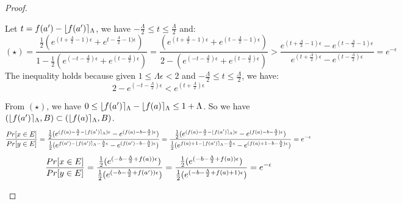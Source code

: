 \documentclass[a4paper,11pt]{article}
\begin{document}
\begin{proof}
\begin{itemize}
	Let $t = f(a') - \lfloor f(a') \rceil_{\Lambda}$, we have $-\frac{\Lambda}{2} \leq t \leq \frac{\Lambda}{2} $ and:
	\[
	(\star) = \frac{{\frac{1}{2}(
				e^{(t + \frac{\Lambda}{2} - 1)\epsilon}
				+ e^{t - \frac{\Lambda}{2} - 1)\epsilon})}
			}
			{1 - \frac{1}{2}(
				e^{(- t - \frac{\Lambda}{2})\epsilon}
				+ e^{(t - \frac{\Lambda}{2})\epsilon})}
	= \frac{ (
				e^{(t + \frac{\Lambda}{2} - 1)\epsilon}
				+ e^{(t -\frac{\Lambda}{2} - 1)\epsilon})
			}
			{2 - (
				e^{(-t - \frac{\Lambda}{2})\epsilon}
				+ e^{(t - \frac{\Lambda}{2})\epsilon})}
	> \frac{
				e^{(t + \frac{\Lambda}{2} - 1)\epsilon}
				-
				e^{(t - \frac{\Lambda}{2} - 1)\epsilon}
			}
			{
				e^{(t + \frac{\Lambda}{2})\epsilon}
				- e^{(t - \frac{\Lambda}{2})\epsilon}
			}	
	= e^{-\epsilon}
	\]
	The inequality holds because given $1 \leq \Lambda \epsilon < 2$
	and $-\frac{\Lambda}{2} \leq t \leq \frac{\Lambda}{2} $, we have:
	\[
	2 - e^{(-t -\frac{\Lambda}{2})\epsilon} < e^{(t + \frac{\Lambda}{2})\epsilon}
	\]	

	From $(\star)$, we have $0 \leq \lfloor f(a') \rceil_{\Lambda} - \lfloor f(a) \rceil_{\Lambda} \leq 1 + \Lambda$.
	So we have $(\lfloor f(a') \rceil_{\Lambda}, B) \subset (\lfloor f(a) \rceil_{\Lambda}, B)$.
	\[
	\frac{Pr[x \in E]}{Pr[y \in E]} 
	= \frac{\frac{1}{2}(
				e^{(f(a) - \frac{\Lambda}{2} - \lfloor f(a') \rceil_{\Lambda})\epsilon}
				- e^{(f(a) -b - \frac{\Lambda}{2})\epsilon})}
				{\frac{1}{2}(
				e^{f(a') - \lfloor f(a') \rceil_{\Lambda} -\frac{\Lambda}{2}\epsilon}
				- e^{(f(a') -b -\frac{\Lambda}{2})\epsilon})} \\
	= \frac{\frac{1}{2}(
				e^{(f(a) - \frac{\Lambda}{2} - \lfloor f(a') \rceil_{\Lambda})\epsilon}
				- e^{(f(a) -b - \frac{\Lambda}{2})\epsilon})}
				{\frac{1}{2}(
				e^{f(a) + 1 - \lfloor f(a') \rceil_{\Lambda} -\frac{\Lambda}{2}\epsilon}
				- e^{(f(a) + 1 -b -\frac{\Lambda}{2})\epsilon})} \\
	= e^{-\epsilon}
	\]
	\[
	\frac{Pr[x \in E]}{Pr[y \in E]} 
	= \frac{\frac{1}{2}(
				e^{(-b -\frac{\Lambda}{2} + f(a))\epsilon})}
				{\frac{1}{2}(
				e^{(-b -\frac{\Lambda}{2} + f(a'))\epsilon})} \\
	= \frac{\frac{1}{2}(
				e^{(-b -\frac{\Lambda}{2} + f(a))\epsilon})}
				{\frac{1}{2}(
				e^{(-b -\frac{\Lambda}{2} + f(a) + 1)\epsilon})} \\
	= e^{-\epsilon}
	\]



\end{itemize}

\end{proof}
\newpage


\end{document}
